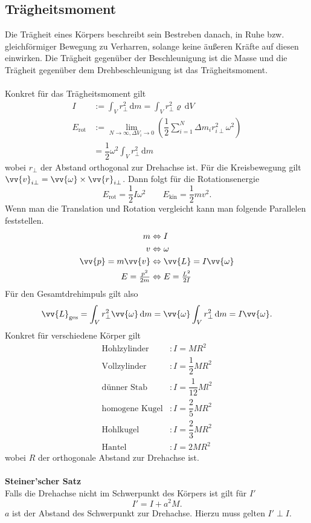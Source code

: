 \documentclass[a4paper,12pt]{article}
\newcommand{\td}{\,\text{d}}
\begin{document}
\subsection{Trägheitsmoment}
Die Trägheit eines Körpers beschreibt sein Bestreben danach, in Ruhe bzw. gleichförmiger Bewegung zu Verharren, solange keine äußeren Kräfte auf diesen einwirken. Die Trägheit gegenüber der Beschleunigung ist die Masse und die Trägheit gegenüber dem Drehbeschleunigung ist das Trägheitsmoment.\\\\
Konkret für das Trägheitsmoment gilt
\begin{align*}
        I&:=\int_{V}^{}r_{\perp}^2\td m=\int_{V}^{}r_{\perp}^2\varrho\td V\\
        E_{\text{rot}}&:=\lim_{N\rightarrow \infty,\Delta V_i\rightarrow 0}\left(\dfrac{1}{2}\sum_{i=1}^{N}\Delta m_ir_{i\perp}^2\omega ^2\right)\\
                      &=\dfrac{1}{2}\omega ^2\int_{V}^{}r_{\perp}^2\td m
\end{align*}
wobei $r_{\perp}$ der Abstand orthogonal zur Drehachse ist. Für die Kreisbewegung gilt $\vv{v}_{i\perp}=\vv{\omega }\times\vv{r}_{i\perp}$. Dann folgt für die Rotationsenergie
\[ 
        E_{\text{rot}}=\dfrac{1}{2}I\omega ^2\qquad E_{\text{kin}}=\dfrac{1}{2}mv^2
.\] 
Wenn man die Translation und Rotation vergleicht kann man folgende Parallelen feststellen.
\begin{align*}
        m&\Leftrightarrow I\\
        v&\Leftrightarrow \omega \\
        \vv{p}=m\vv{v}&\Leftrightarrow \vv{L}=I\vv{\omega }\\
        E=\tfrac{p^2}{2m}&\Leftrightarrow E=\tfrac{L^2}{2I}
\end{align*}
Für den Gesamtdrehimpuls gilt also
\[ 
        \vv{L}_{\text{ges}}=\int_{V}^{}r_{\perp}^2\vv{\omega }\td m=\vv{\omega }\int_{V}^{}r_{\perp}^2\td m=I\vv{\omega }
.\] 
Konkret für verschiedene Körper gilt
\begin{align*}
        \text{Hohlzylinder}&:I=MR^2\\
        \text{Vollzylinder}&:I=\dfrac{1}{2}MR^2\\
        \text{dünner Stab}&:I=\dfrac{1}{12}Ml ^2\\
        \text{homogene Kugel}&:I=\dfrac{2}{5}MR^2\\
        \text{Hohlkugel}&:I=\dfrac{2}{3}MR^2\\
        \text{Hantel}&:I=2MR^2
\end{align*}
wobei $R$ der orthogonale Abstand zur Drehachse ist.
\\\hfill\\\textbf{Steiner'scher Satz}\\ 
Falls die Drehachse nicht im Schwerpunkt des Körpers ist gilt für $I'$ 
\[ 
        I'=I+a^2M
.\] 
$a$ ist der Abstand des Schwerpunkt zur Drehachse. Hierzu muss gelten $I'\perp I$.
\end{document}
